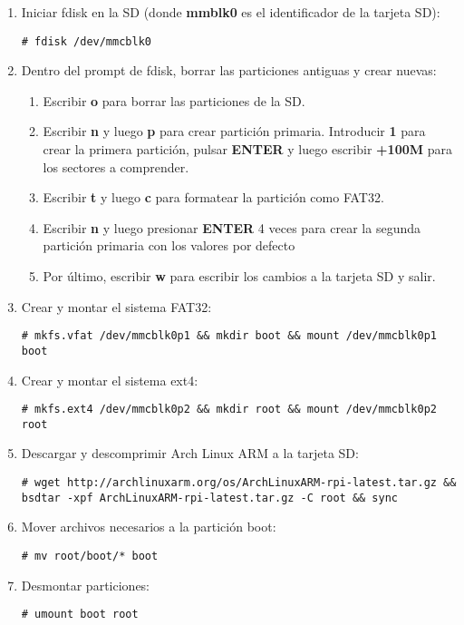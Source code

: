     \begin{enumerate}
        \item Iniciar fdisk en la SD (donde \textbf{mmblk0} es el identificador de la tarjeta SD):
            \begin{verbatim}
# fdisk /dev/mmcblk0
            \end{verbatim}
        \item Dentro del prompt de fdisk, borrar las particiones antiguas y crear nuevas:
            \begin{enumerate}
                \item Escribir \textbf{o} para borrar las particiones de la SD.
                \item Escribir \textbf{n} y luego \textbf{p} para crear partición primaria. Introducir \textbf{1} para crear la primera partición, pulsar \textbf{ENTER} y luego escribir \textbf{+100M} para los sectores a comprender.
                \item Escribir \textbf{t} y luego \textbf{c} para formatear la partición como FAT32.
                \item Escribir \textbf{n} y luego presionar \textbf{ENTER} 4 veces para crear la segunda partición primaria con los valores por defecto
                \item Por último, escribir \textbf{w} para escribir los cambios a la tarjeta SD y salir.
            \end{enumerate}
        \item Crear y montar el sistema FAT32:
            \begin{verbatim}
# mkfs.vfat /dev/mmcblk0p1 && mkdir boot && mount /dev/mmcblk0p1 boot
            \end{verbatim}
        \item Crear y montar el sistema ext4:
            \begin{verbatim}
# mkfs.ext4 /dev/mmcblk0p2 && mkdir root && mount /dev/mmcblk0p2 root
            \end{verbatim}
        \item Descargar y descomprimir Arch Linux ARM a la tarjeta SD:
            \begin{verbatim}
# wget http://archlinuxarm.org/os/ArchLinuxARM-rpi-latest.tar.gz && bsdtar -xpf ArchLinuxARM-rpi-latest.tar.gz -C root && sync
            \end{verbatim}
        \item Mover archivos necesarios a la partición boot:
            \begin{verbatim}
# mv root/boot/* boot
            \end{verbatim}
         \item Desmontar particiones:
            \begin{verbatim}
# umount boot root
            \end{verbatim}
    \end{enumerate}

